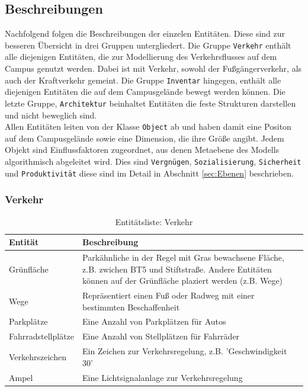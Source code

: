 \documentclass[10pt]{scrartcl}
\begin{document}
	\subsection{Beschreibungen}
	Nachfolgend folgen die Beschreibungen der einzelen Entitäten. Diese sind zur besseren Übersicht in drei Gruppen untergliedert. Die Gruppe \verb!Verkehr! enthält alle diejenigen Entitäten, die zur Modellierung des Verkehrsflusses auf dem Campus genutzt werden. Dabei ist mit Verkehr, sowohl der Fußgängerverkehr, als auch der Kraftverkehr gemeint.
	Die Gruppe \verb!Inventar! hingegen, enthält alle diejenigen Entitäten die auf dem Campusgelände bewegt werden können. Die letzte Gruppe, \verb!Architektur! beinhaltet Entitäten die feste Strukturen darstellen und nicht beweglich sind.\\
	Allen Entitäten leiten von der Klasse \verb!Object! ab und haben damit eine Positon auf dem Campusgelände sowie eine Dimension, die ihre Größe angibt. Jedem Objekt sind Einflussfaktoren zugeordnet, aus denen Metaebene des Modells algorithmisch abgeleitet wird. Dies sind \verb!Vergnügen!,
	\verb!Sozialisierung!, \verb!Sicherheit! und \verb!Produktivität! diese sind im Detail in Abschnitt \ref{sec:Ebenen} beschrieben.
	
	\subsubsection{Verkehr}
	
	

\begin{table}[!htb]
	\centering
\begin{longtable}{|p{}|p{}|}
\hline \textbf{Entität} & \textbf{Beschreibung} \\ 
\hline
\hline Grünfläche & Parkähnliche in der Regel mit Gras bewachsene Fläche, z.B. zwichen BT5 und Stiftstraße. Andere Entitäten können auf der Grünfläche plaziert werden (z.B. Wege) \\ 
\hline Wege & Repräsentiert einen Fuß oder Radweg mit einer bestimmten Beschaffenheit\\ 
\hline Parkplätze & Eine Anzahl von Parkplätzen für Autos\\ 
\hline Fahrradstellplätze & Eine Anzahl von Stellplätzen für Fahrräder \\ 
\hline Verkehrszeichen & Ein Zeichen zur Verkehrsregelung, z.B. 'Geschwindigkeit 30' \\ 
\hline Ampel & Eine Lichtsignalanlage zur Verkehrsregelung  \\ 
\hline 
\end{longtable}	
	\label{tab:entitiesTraffic}
	\caption{Entitätsliste: Verkehr}	
\end{table}		
\end{document}
